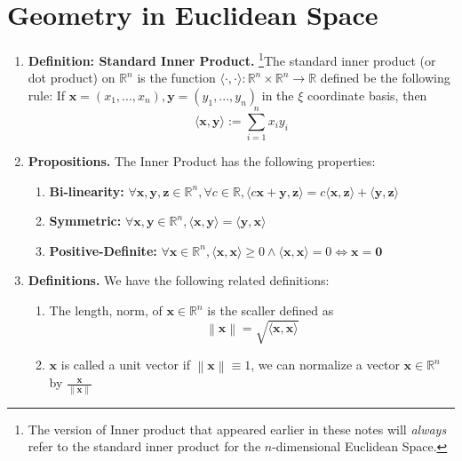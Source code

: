 \documentclass[oneside, 12pt]{book}
\newcommand{\settag}[1]{\renewcommand{\theenumi}{#1}}
\newcommand{\R}{\mathbb{R}}
\newcommand{\tbf}[1]{\textbf{#1}}
\newcommand{\tit}[1]{\textit{#1}}
\newcommand{\norm}[1]{\left\lVert#1\right\rVert}
\newcommand{\para}[1]{\item \tbf{#1}}
\newcommand{\vx}{\mathbf{x}}
\newcommand{\vy}{\mathbf{y}}
\newcommand{\vz}{\mathbf{z}}
\newcommand{\vzero}{\mathbf{0}}
\begin{document}
\section{Geometry in Euclidean Space}
\begin{enumerate}
    \settag{4.3.1}
    \para{Definition: Standard Inner Product.} \footnote{The version of Inner product that appeared earlier in these notes will \tit{always} refer to the standard inner product for the $n$-dimensional Euclidean Space.}The standard inner product (or dot product) on $\R^n$ is the function
    $\langle\cdot,\cdot\rangle: \R^n \times \R^n \rightarrow{} \R$
    defined be the following rule: If $\vx = (x_1,...,x_n), \vy = (y_1,...,y_n)$ in the $\xi$ coordinate basis, then 
    \begin{equation*}
        \langle\vx,\vy \rangle := \sum_{i=1}^n x_iy_i
    \end{equation*}
    
    \settag{4.3.2}
    \para{Propositions.} The Inner Product has the following properties:
    \begin{enumerate}
        \item \textbf{Bi-linearity:} $\forall \vx, \vy, \vz \in \R^n, \forall c\in \R, \langle c\vx + \vy,\vz\rangle = c\langle\vx,\vz\rangle + \langle \vy,\vz \rangle$
        \item \textbf{Symmetric:} $\forall \vx, \vy\in\R^n, \langle \vx,\vy\rangle = \langle \vy,\vx \rangle$
        \item \textbf{Positive-Definite:} $\forall \vx \in \R^n, \langle \vx,\vx \rangle \geq 0 \land \langle \vx,\vx \rangle = 0 \iff \vx = \vzero$
    \end{enumerate}
    
    \settag{4.3.3}
    \para{Definitions.} We have the following related definitions:
    \begin{enumerate}
        \item The length, norm, of $\vx \in \R^n$ is the scaller defined as
        \begin{equation*}
            \norm{\vx} = \sqrt{\langle\vx,\vx\rangle}
        \end{equation*}
        \item $\vx$ is called a unit vector if $\norm{\vx} \equiv 1$, we can normalize 
        a vector $\vx\in \R^n$ by $\frac{\vx}{\norm{\vx}}$
    \end{enumerate}
    

\end{enumerate}
\end{document}

